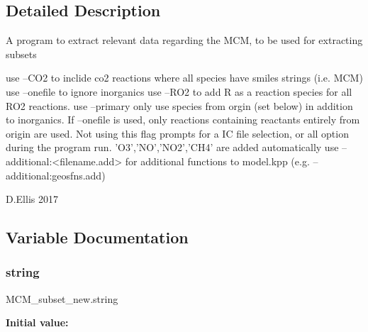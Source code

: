 \subsection{Detailed Description}
\begin{DoxyVerb}A program to extract relevant data regarding the MCM,
to be used for extracting subsets

use --CO2 to inclide co2 reactions where all species have smiles strings (i.e. MCM)
use --onefile to ignore inorganics
use --RO2 to add R as a reaction species for all RO2 reactions.
use --primary only use species from orgin (set below) in addition to inorganics. If --onefile is used, only reactions containing reactants entirely from origin are used. Not using this flag prompts for a IC file selection, or all option during the program run. {'O3','NO','NO2','CH4'} are added automatically
use --additional:<filename.add> for additional functions to model.kpp (e.g. --additional:geosfns.add)

D.Ellis 2017
\end{DoxyVerb}
 

\subsection{Variable Documentation}
\mbox{\label{namespaceMCM__subset__new_aeb20c414a565c766c95ca31a2a310909}} 
\subsubsection{\texorpdfstring{string}{string}}
{\footnotesize\ttfamily M\+C\+M\+\_\+subset\+\_\+new.\+string}

{\bfseries Initial value\+:}
